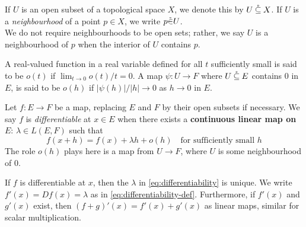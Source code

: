\documentclass[../main-v2-manifolds.tex]{subfiles}
\begin{document}
\newpage
{}
\begin{definition}\label{def:osub-notation}
    If $U$ is an open subset of a topological space $X$, we denote this by $U\:\mathring{\subseteq}\: X$. If $U$ is a \emph{neighbourhood} of a point $p\in X$, we write $p\mathring{\in} U$. \\
    
    We do not require neighbourhoods to be open sets; rather, we say $U$ is a neighbourhood of $p$ when the interior of $U$ contains $p$.
\end{definition}
\begin{definition}[Little $o$]\label{def:little-oh}
    A real-valued function in a real variable defined for all $t$ sufficiently small is said to be \emph{$o(t)$} if $\lim_{t\to 0}o(t)/t=0$. A map $\psi: U\to  F$ where $U\:\mathring{\subseteq}\: E$ contains $0$ in $E$, is said to be $o(h)$ if $\vert \psi(h)\vert/\vert h\vert \to 0$ as $h\to 0$ in $E$.
\end{definition}
\begin{definition}[Differentiability]\label{def:differentiability}
    Let $f: E\to F$ be a map, replacing $E$ and $F$ by their open subsets if necessary. We say $f$ is \emph{differentiable} at $x\in E$ when there exists a \textbf{continuous linear map on $E$}: $\lambda\in L(E,F)$ such that
    \begin{equation}\label{eq:differentiability}
        f(x+h) = f(x) + \lambda h + o(h)\quad\text{for sufficiently small }h
    \end{equation}
    The role $o(h)$ plays here is a map from $U\to F$, where $U$ is some neighbourhood of $0$. 
\end{definition}
\begin{wts}\label{prop:basic-properties-of-derivative}
    If $f$ is differentiable at $x$, then the $\lambda$ in \cref{eq:differentiability} is unique. We write $f'(x) = Df(x) = \lambda$ as in \cref{eq:differentiability-def}. Furthermore, if $f'(x)$ and $g'(x)$ exist, then $(f+g)'(x) = f'(x) + g'(x)$ as linear maps, similar for scalar multiplication.
\end{wts}
\end{document}
